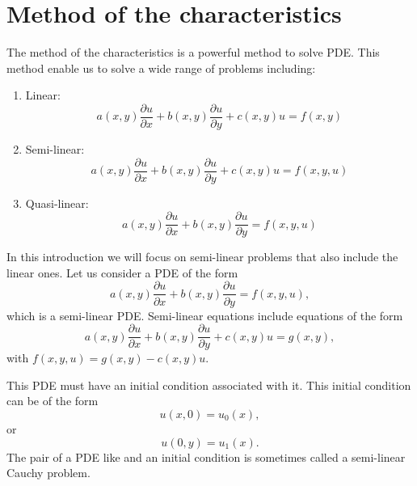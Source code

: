 \label{seq_method_characteristics}
\section{Method of the characteristics}


The method of the characteristics is a powerful method to solve PDE. This method enable us to solve a wide range of problems including:
\begin{enumerate}
  \item Linear:
  \begin{equation}
  a(x, y) \frac{\partial u}{\partial x}
  + b(x, y) \frac{\partial u}{\partial y}
  + c(x, y) u
  = f(x, y)
  \end{equation}
  \item Semi-linear:
  \begin{equation}
  a(x, y) \frac{\partial u}{\partial x}
  + b(x, y) \frac{\partial u}{\partial y}
  + c(x, y) u
  = f(x, y, u)
  \end{equation}
  \item  Quasi-linear:
  \begin{equation}
  a(x, y) \frac{\partial u}{\partial x}
  + b(x, y) \frac{\partial u}{\partial y}
  = f(x, y, u)
  \end{equation}
\end{enumerate}

In this introduction  we will focus on semi-linear problems that also include
the linear ones. Let us consider a PDE of the form
\begin{equation}
  a(x, y) \frac{\partial u}{\partial x}
  + b(x, y) \frac{\partial u}{\partial y}
  = f(x, y, u),
  \label{eq_semi_linear}
\end{equation}
which is a semi-linear PDE. Semi-linear equations include equations of the form
\begin{equation}
  a(x, y) \frac{\partial u}{\partial x}
  + b(x, y) \frac{\partial u}{\partial y}
  + c(x, y) u
  = g(x, y),
\end{equation}
with $f(x, y, u) = g(x, y) - c(x, y) u$.

This PDE must have an initial condition associated with it. This initial
condition can be of the form
\begin{equation}
  u(x, 0) = u_0(x),
\end{equation}
or
\begin{equation}
  u(0, y) = u_1(x).
\end{equation}
The pair of a PDE like  and an initial condition is
sometimes called a semi-linear Cauchy problem.

